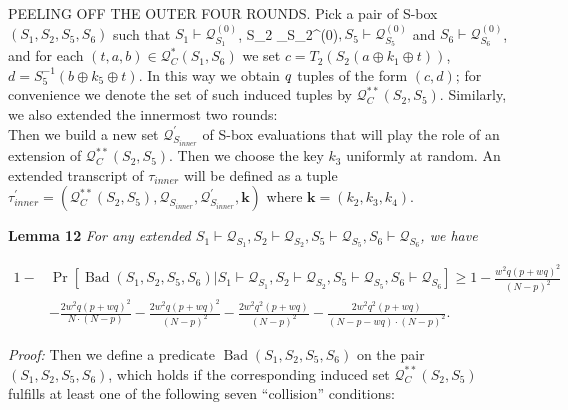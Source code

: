 \noindent
\textsc{PEELING OFF THE OUTER FOUR ROUNDS}. Pick a pair of S-box $(S_1, S_2, S_{5}, S_6)$ such that $S_{1} \vdash \mathcal{Q}_{S_{1}}^{(0)}$, S_{2} \vdash {}_{S_{2}}^{(0)}$, S_{5} \vdash \mathcal{Q}_{S_{5}}^{(0)}$   and $S_{6} \vdash \mathcal{Q}_{S_{6}}^{(0)}$, and for each $ (t, a, b) \in \mathcal{Q}_{C}^{*}\left(S_{1}, S_{6}\right)$ we set $c=T_{2}\left(S_{2}\left(a \oplus k_{1} \oplus t\right)\right)$, $d=S_{5}^{-1}\left(b \oplus k_{5} \oplus t\right)$. In this way we obtain $\mathnormal{q}$ tuples of the form $(c, d)$; for convenience we denote the set of such induced tuples by $\mathcal{Q}_{C}^{**}\left(S_{2}, S_{5}\right)$. Similarly, we also extended the innermost two rounds:\\

Then we build a new set $\mathcal{Q}_{S_{inner}}^{\prime}$ of S-box evaluations that will play the role of an extension of $\mathcal{Q}_{C}^{**}\left(S_{2}, S_{5}\right)$. Then we choose the key $k_3$ uniformly at random. An extended transcript of $\tau_{inner}$ will be defined as a tuple $\tau_{inner}^{\prime}=\left(\mathcal{Q}_{C}^{**}\left(S_{2}, S_{5}\right), \mathcal{Q}_{S_{inner}}, \mathcal{Q}_{S_{inner}}^{\prime}, \mathbf{k}\right)$ where $\mathbf{k}=\left(k_{2}, k_{3}, k_{4}\right)$.

\noindent \textbf{Lemma 12} \emph{ For any extended $S_{1} \vdash \mathcal{Q}_{S_{1}}, S_{2} \vdash \mathcal{Q}_{S_{2}}, S_{5} \vdash \mathcal{Q}_{S_{5}}, S_{6} \vdash \mathcal{Q}_{S_{6}}$, we have}

\begin{equation}
\begin{aligned}
1-&\operatorname{Pr}\left[\operatorname{Bad}\left(S_{1}, S_2, S_{5}, S_6\right) | S_{1} \vdash \mathcal{Q}_{S_{1}}, S_{2} \vdash \mathcal{Q}_{S_{2}}, S_{5} \vdash \mathcal{Q}_{S_{5}}, S_{6} \vdash \mathcal{Q}_{S_{6}}\right] \geq 1- \frac{w^{2} q (p+w q)^{2}}{(N-p)^{2}}\\
& -\frac{2 w^{2} q (p+w q)^{2}}{N \cdot (N-p)} - \frac{2 w^{2} q (p+w q)^{2}}{(N-p)^2} - \frac{2 w^{2} q^{2} (p+w q)}{(N-p)^2} - \frac{2 w^{2} q^{2} (p+w q)}{(N- p- wq) \cdot (N-p)^2}.
\end{aligned}
\end{equation}

\noindent \emph{Proof:} Then we define a predicate $\operatorname{Bad}\left(S_{1}, S_2, S_{5}, S_6\right)$ on the pair $(S_1,S_2, S_5, S_6)$, which holds if the corresponding induced set $\mathcal{Q}_{C}^{**}\left(S_{2}, S_{5}\right)$ fulfills at least one of the following seven ``collision'' conditions:

